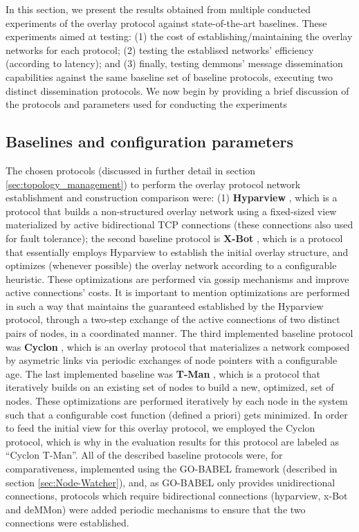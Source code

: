 


In this section, we present the results obtained from multiple conducted experiments of the overlay protocol against state-of-the-art baselines. These experiments aimed at testing: (1) the cost of establishing/maintaining the overlay networks for each protocol; (2) testing the establised networks' efficiency (according to latency); and (3) finally, testing demmons' message dissemination capabilities against the same baseline set of baseline protocols, executing two distinct dissemination protocols. We now begin by providing a brief discussion of the protocols and parameters used for conducting the experiments

\subsection{Baselines and configuration parameters}

The chosen protocols (discussed in further detail in section \ref{sec:topology_management}) to perform the overlay protocol network establishment and construction comparison were: (1) \textbf{Hyparview} , which is a protocol that builds a non-structured overlay network using a fixed-sized view materialized by active bidirectional TCP connections (these connections also used for fault tolerance); the second baseline protocol is \textbf{X-Bot} , which is a protocol that essentially employs Hyparview to establish the initial overlay structure, and optimizes (whenever possible) the overlay network according to a configurable heuristic. These optimizations are performed via gossip mechanisms and improve active connections' costs. It is important to mention optimizations are performed in such a way that maintains the guaranteed established by the Hyparview protocol, through a two-step exchange of the active connections of two distinct pairs of nodes, in a coordinated manner. The third implemented baseline protocol was \textbf{Cyclon} , which is an overlay protocol that materializes a network composed by asymetric links via periodic exchanges of node pointers with a configurable age. The last implemented baseline was \textbf{T-Man} , which is a protocol that iteratively builds on an existing set of nodes to build a new, optimized, set of nodes. These optimizations are performed iteratively by each node in the system such that a configurable cost function  (defined a priori) gets minimized. In order to feed the initial view for this overlay protocol, we employed the Cyclon protocol, which is why in the evaluation results for this protocol are labeled as ``Cyclon T-Man''. All of the described baseline protocols were, for comparativeness, implemented using the GO-BABEL framework (described in section \ref{sec:Node-Watcher}), and, as GO-BABEL only provides unidirectional connections, protocols which require bidirectional connections (hyparview, x-Bot and deMMon) were added periodic mechanisms to ensure that the two connections were established.


